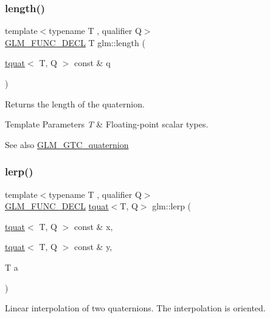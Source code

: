 \subsubsection{\texorpdfstring{length()}{length()}}
{\footnotesize\ttfamily template$<$typename T , qualifier Q$>$ \\
\hyperlink{setup_8hpp_ab2d052de21a70539923e9bcbf6e83a51}{G\+L\+M\+\_\+\+F\+U\+N\+C\+\_\+\+D\+E\+CL} T glm\+::length (\begin{DoxyParamCaption}\item[{\hyperlink{structglm_1_1tquat}{tquat}$<$ T, Q $>$ const \&}]{q }\end{DoxyParamCaption})}

Returns the length of the quaternion.


\begin{DoxyTemplParams}{Template Parameters}
{\em T} & Floating-\/point scalar types.\\
\hline
\end{DoxyTemplParams}
\begin{DoxySeeAlso}{See also}
\hyperlink{group__gtc__quaternion}{G\+L\+M\+\_\+\+G\+T\+C\+\_\+quaternion} 
\end{DoxySeeAlso}
\mbox{\label{group__gtc__quaternion_gabc58e7013ef63d6df69c28c14afd0c01}} 
\subsubsection{\texorpdfstring{lerp()}{lerp()}}
{\footnotesize\ttfamily template$<$typename T , qualifier Q$>$ \\
\hyperlink{setup_8hpp_ab2d052de21a70539923e9bcbf6e83a51}{G\+L\+M\+\_\+\+F\+U\+N\+C\+\_\+\+D\+E\+CL} \hyperlink{structglm_1_1tquat}{tquat}$<$T, Q$>$ glm\+::lerp (\begin{DoxyParamCaption}\item[{\hyperlink{structglm_1_1tquat}{tquat}$<$ T, Q $>$ const \&}]{x,  }\item[{\hyperlink{structglm_1_1tquat}{tquat}$<$ T, Q $>$ const \&}]{y,  }\item[{T}]{a }\end{DoxyParamCaption})}

Linear interpolation of two quaternions. The interpolation is oriented.


